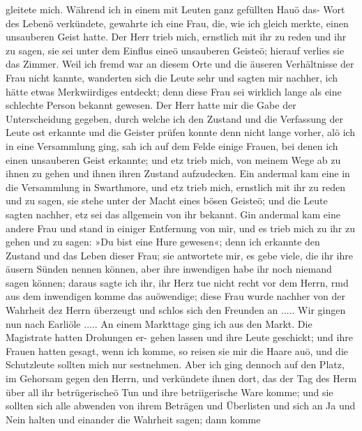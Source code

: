 gleitete mich. Während ich in einem mit Leuten ganz gefüllten
Hauö das- Wort des Lebenö verkündete, gewahrte ich eine Frau,
die, wie ich gleich merkte, einen unsauberen Geist hatte. Der
Herr trieb mich, ernstlich mit ihr zu reden und ihr zu sagen, sie
sei unter dem Einflus eineö unsauberen Geisteö; hierauf verlies
sie das Zimmer. Weil ich fremd war an diesem Orte und die
äuseren Verhältnisse der Frau nicht kannte, wanderten sich die
Leute sehr und sagten mir nachher, ich hätte etwas Merkwiirdiges
entdeckt; denn diese Frau sei wirklich lange als eine schlechte
Person bekannt gewesen. Der Herr hatte mir die Gabe der
Unterscheidung gegeben, durch welche ich den Zustand und die
Verfassung der Leute ost erkannte und die Geister prüfen konnte
denn nicht lange vorher, alö ich in eine Versammlung ging, sah
ich auf dem Felde einige Frauen, bei denen ich einen unsauberen
Geist erkannte; und etz trieb mich, von meinem Wege ab zu ihnen
zu gehen und ihnen ihren Zustand aufzudecken. Ein andermal
kam eine in die Versammlung in Swarthmore, und etz trieb mich,
ernstlich mit ihr zu reden und zu sagen, sie stehe unter der Macht
eines bösen Geisteö; und die Leute sagten nachher, etz sei das
allgemein von ihr bekannt. Gin andermal kam eine andere Frau
und stand in einiger Entfernung von mir, und es trieb mich zu
ihr zu gehen und zu sagen: »Du bist eine Hure gewesen«; denn
ich erkannte den Zustand und das Leben dieser Frau; sie antwortete
mir, es gebe viele, die ihr ihre äusern Sünden nennen können,
aber ihre inwendigen habe ihr noch niemand sagen können; daraus
sagte ich ihr, ihr Herz tue nicht recht vor dem Herrn, rmd
aus dem inwendigen komme das auöwendige; diese Frau wurde
nachher von der Wahrheit dez Herrn überzeugt und schlos sich
den Freunden an .....
Wir gingen nun nach Earliöle ..... An einem Markttage
ging ich aus den Markt. Die Magistrate hatten Drohungen er-
gehen lassen und ihre Leute geschickt; und ihre Frauen hatten
gesagt, wenn ich komme, so reisen sie mir die Haare auö, und
die Schutzleute sollten mich nur sestnehmen. Aber ich ging dennoch
auf den Platz, im Gehorsam gegen den Herrn, und verkündete
ihnen dort, das der Tag des Herm über all ihr betrügerischeö
Tun und ihre betriigerische Ware komme; und sie sollten sich alle
abwenden von ihrem Beträgen und Überlisten und sich an Ja
und Nein halten und einander die Wahrheit sagen; dann komme



